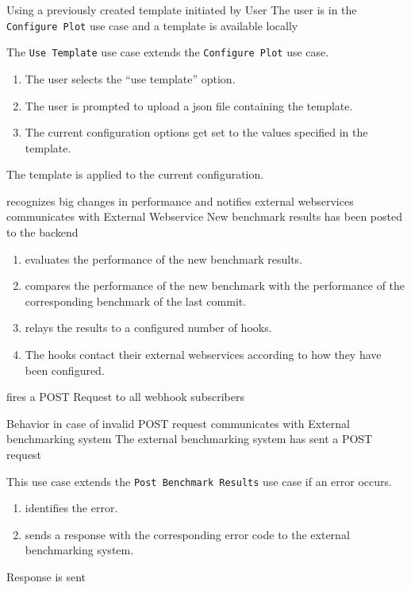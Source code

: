 \bigskip

{Using a previously created template}
{initiated by User}
{The user is in the \texttt{Configure Plot} use case and a \gls{template} is available locally}
{The \texttt{Use Template} use case extends the \texttt{Configure Plot} use case.
\begin{enumerate}
    \item The user selects the \enquote{use template} option.
    \item The user is prompted to upload a \gls{json} file containing the \gls{template}.
    \item The current \gls{configuration} options get set to the values specified in the \gls{template}.
\end{enumerate}}
{The \gls{template} is applied to the current configuration.}

\bigskip

{\parkview{} recognizes big changes in performance and notifies external webservices}
{communicates with External Webservice}
{New \glspl{benchmark result} has been posted to the backend}
{\begin{enumerate}
    \item \parkview{} evaluates the performance of the new \glspl{benchmark result}.
    \item \parkview{} compares the performance of the new benchmark with the performance of the corresponding benchmark of the last commit.
    \item \parkview{} relays the results to a configured number of hooks.
    \item The hooks contact their external webservices according to how they have been configured.
\end{enumerate}}
{\parkview{} fires a POST Request to all webhook subscribers}

\bigskip

{Behavior in case of invalid POST request}
{communicates with External \Gls{benchmarking system}}
{The external \gls{benchmarking system} has sent a POST request}
{This use case extends the \texttt{Post Benchmark Results} use case if an error occurs.
\begin{enumerate}
    \item \parkview{} identifies the error.
    \item \parkview{} sends a response with the corresponding error code to the external \gls{benchmarking system}.
\end{enumerate}}
{Response is sent}

